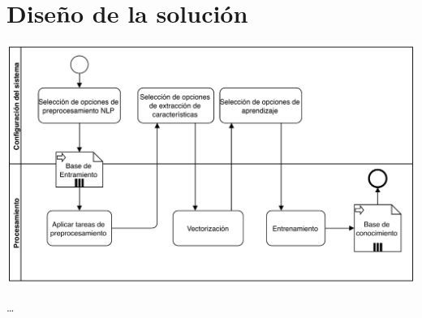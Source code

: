 
\chapter{Diseño de la solución}

\resizebox{0.5\textwidth}{!}{}

\includegraphics[width=\textwidth]{bpmn-entrenamiento}

\ldots
